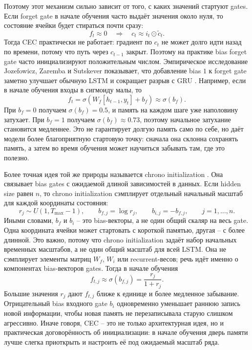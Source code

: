 \documentclass[12pt,fleqn]{article}
\begin{document}
Поэтому этот механизм сильно зависит от того, с каких значений стартуют gates.
Если forget gate в начале обучения часто выдаёт значения около нуля, то состояние ячейки будет стираться почти сразу:
\begin{equation}
  f_t \approx 0
  \quad \Rightarrow \quad
  c_t \approx i_t \odot \widetilde{c}_t.
\end{equation}
Тогда CEC практически не работает: градиент по $c_t$ не может долго идти назад по времени, потому что путь через $c_{t-1}$ закрыт.
Поэтому на практике bias forget gate часто инициализируют положительным числом.
Эмпирическое исследование Jozefowicz, Zaremba и Sutskever показывает, что добавление bias $1$ к forget gate заметно улучшает обычную LSTM и сокращает разрыв с GRU \cite{jozefowicz2015}.
Например, если в начале обучения входы в сигмоиду малы, то
\begin{equation}
  f_t
  =
  \sigma(W_f [h_{t-1}, y_t] + b_f)
  \approx
  \sigma(b_f).
\end{equation}
При $b_f = 0$ получаем $\sigma(b_f) = 0.5$, и память на каждом шаге уже наполовину затухает.
При $b_f = 1$ получаем $\sigma(b_f) \approx 0.73$, поэтому начальное затухание становится медленнее.
Это не гарантирует долгую память само по себе, но даёт модели более благоприятную стартовую точку: сначала она склонна сохранять память, а затем во время обучения может научиться забывать там, где это полезно.

Более точная идея той же природы называется chrono initialization \cite{tallec2018}.
Она связывает bias gates с ожидаемой длиной зависимостей в данных.
Если hidden size равен $n$, то chrono initialization сэмплирует отдельный начальный масштаб для каждой координаты состояния:
\begin{equation}
  r_j \sim U(1, T_{\max} - 1),
  \qquad
  b_{f,j} = \log r_j,
  \qquad
  b_{i,j} = -b_{f,j},
  \qquad
  j = 1,\ldots,n.
\end{equation}
Иными словами, $b_f$ и $b_i$ -- это bias-векторы, а не один общий скаляр на весь gate.
Одна координата ячейки может стартовать с короткой памятью, другая -- с более длинной.
Это важно, потому что chrono initialization задаёт набор начальных временных масштабов, а не один общий масштаб для всей LSTM.
Она не сэмплирует элементы матриц $W_f$, $W_i$ или recurrent-весов; речь идёт именно о компонентах bias-векторов gates.
Тогда в начале обучения
\begin{equation}
  f_{t,j} \approx \sigma(b_{f,j}) = \frac{r_j}{1 + r_j}.
\end{equation}
Большие значения $r_j$ дают $f_{t,j}$ ближе к единице и более медленное забывание.
Отрицательный bias входного gate $b_i$ одновременно уменьшает раннюю запись новой информации, чтобы новая память не перезаписывала старую слишком агрессивно.
Иначе говоря, CEC -- это не только архитектурная идея, но и практическая договорённость об инициализации: в начале обучения дверь памяти лучше слегка приоткрыть и настроить её под ожидаемый масштаб ряда.
\end{document}
